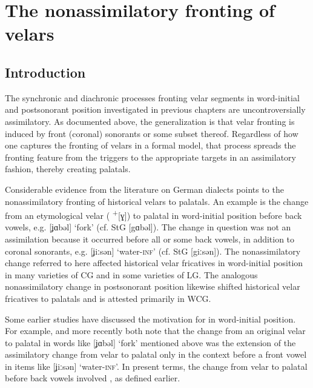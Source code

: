 \chapter{The nonassimilatory fronting of velars}\label{sec:14}
\section{Introduction}\label{sec:14.1}

The synchronic and diachronic processes fronting velar segments in word-initial and postsonorant position investigated in previous chapters are uncontroversially assimilatory. As documented above, the generalization is that velar fronting is induced by front (coronal) sonorants or some subset thereof. Regardless of how one captures the fronting of velars in a formal model, that process spreads the fronting feature from the triggers to the appropriate targets in an assimilatory fashion, thereby creating palatals.

\begin{sloppypar}
Considerable evidence from the literature on German dialects points to the nonassimilatory fronting of historical velars to palatals. An example is the change from an etymological velar ( \textsuperscript{+}[ɣ]) to palatal in word-initial position before back vowels, e.g. [ʝɑbəl] ‘fork’ (cf. StG [gɑbəl]). The change in question was not an assimilation because it occurred before all or some back vowels, in addition to coronal sonorants, e.g. [ʝiːsən] ‘water-\textsc{inf}’ (cf. StG [giːsən]). The nonassimilatory change referred to here affected historical velar fricatives in word-initial position in many varieties of CG and in some varieties of LG. The analogous nonassimilatory change in postsonorant position likewise shifted historical velar fricatives to palatals and is attested primarily in WCG.
\end{sloppypar}

Some earlier studies have discussed the motivation for  in word-initial position. For example, \citet[1707]{Scheutz2005} and more recently \citet[10]{Hinskens2021} both note that the change from an original velar to palatal in words like [ʝɑbəl] ‘fork’ mentioned above was the extension of the assimilatory change from velar to palatal only in the context before a front vowel in items like [ʝiːsən] ‘water-\textsc{inf}’. In present terms, the change from velar to palatal before back vowels involved , as defined earlier.

